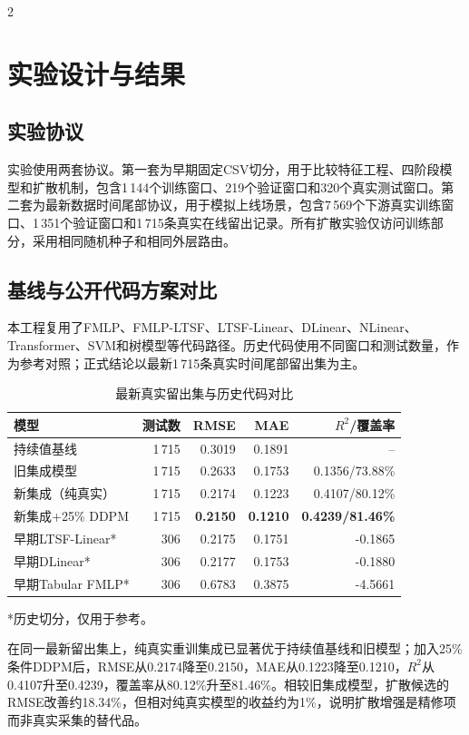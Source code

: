 \documentclass[UTF8,a4paper,10pt]{ctexart}
\begin{document}
\begin{multicols}{2}
\section{实验设计与结果}
\subsection{实验协议}
实验使用两套协议。第一套为早期固定CSV切分，用于比较特征工程、四阶段模型和扩散机制，包含1\,144个训练窗口、219个验证窗口和320个真实测试窗口。第二套为最新数据时间尾部协议，用于模拟上线场景，包含7\,569个下游真实训练窗口、1\,351个验证窗口和1\,715条真实在线留出记录。所有扩散实验仅访问训练部分，采用相同随机种子和相同外层路由。

\subsection{基线与公开代码方案对比}
本工程复用了FMLP、FMLP-LTSF、LTSF-Linear、DLinear、NLinear、Transformer、SVM和树模型等代码路径。历史代码使用不同窗口和测试数量，作为参考对照；正式结论以最新1\,715条真实时间尾部留出集为主。

\begin{table}[H]
\centering\scriptsize
\caption{最新真实留出集与历史代码对比}
\begin{tabularx}{\linewidth}{p{2.2cm}r r r r}
\toprule
模型 & 测试数 & RMSE & MAE & $R^2$/覆盖率\\
\midrule
持续值基线 & 1\,715 & 0.3019 & 0.1891 & --\\
旧集成模型 & 1\,715 & 0.2633 & 0.1753 & 0.1356/73.88\%\\
新集成（纯真实） & 1\,715 & 0.2174 & 0.1223 & 0.4107/80.12\%\\
新集成+25\% DDPM & 1\,715 & \textbf{0.2150} & \textbf{0.1210} & \textbf{0.4239/81.46\%}\\
早期LTSF-Linear* & 306 & 0.2175 & 0.1751 & -0.1865\\
早期DLinear* & 306 & 0.2177 & 0.1753 & -0.1880\\
早期Tabular FMLP* & 306 & 0.6783 & 0.3875 & -4.5661\\
\bottomrule
\end{tabularx}
\end{table}
\noindent\footnotesize{*历史切分，仅用于参考。}

在同一最新留出集上，纯真实重训集成已显著优于持续值基线和旧模型；加入25\%条件DDPM后，RMSE从0.2174降至0.2150，MAE从0.1223降至0.1210，$R^2$从0.4107升至0.4239，覆盖率从80.12\%升至81.46\%。相较旧集成模型，扩散候选的RMSE改善约18.34\%，但相对纯真实模型的收益约为1\%，说明扩散增强是精修项而非真实采集的替代品。


\end{multicols}
\end{document}
